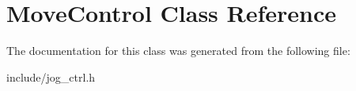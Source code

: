 \hypertarget{classMoveControl}{}\section{Move\+Control Class Reference}
\label{classMoveControl}


The documentation for this class was generated from the following file\+:\begin{DoxyCompactItemize}
\item 
include/jog\+\_\+ctrl.\+h\end{DoxyCompactItemize}
